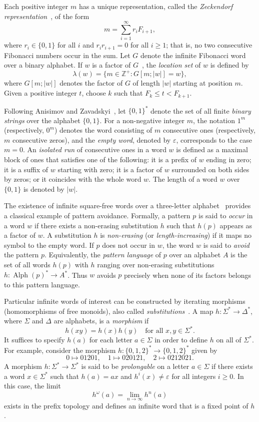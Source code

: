 \documentclass[12pt, a4paper]{article}
\begin{document}
Each positive integer $m$ has a unique representation, called the \emph{Zeckendorf representation}~\cite{Shah2021}, of the form
\[
m = \sum_{i=1}^{\infty} r_i F_{i+1},
\]
where $r_i \in \{0,1\}$ for all $i$ and $r_i r_{i+1} = 0$ for all $i \ge 1$; that is, no two consecutive Fibonacci numbers occur in the sum. Let $G$ denote the infinite Fibonacci word over a binary alphabet. If $w$ is a factor of $G$~\cite{Chuan2005}, the \emph{location set} of $w$ is defined by
\[
\lambda(w) = \{ m \in \mathbb{Z}^+ : G[m;|w|] = w \},
\]
where $G[m;|w|]$ denotes the factor of $G$ of length $|w|$ starting at position $m$. Given a positive integer $t$, choose $k$ such that $F_k \le t < F_{k+1}$.

Following Anisimov and Zavadskyi~\cite{Anisimov2017}, let $\{0,1\}^*$ denote the set of all finite \emph{binary strings} over the alphabet $\{0,1\}$. For a non-negative integer $m$, the notation $1^m$ (respectively, $0^m$) denotes the word consisting of $m$ consecutive ones (respectively, $m$ consecutive zeros), and the \emph{empty word}, denoted by $\varepsilon$, corresponds to the case $m=0$. An \emph{isolated run} of consecutive ones in a word $w$ is defined as a maximal block of ones that satisfies one of the following: it is a prefix of $w$ ending in zero; it is a suffix of $w$ starting with zero; it is a factor of $w$ surrounded on both sides by zeros; or it coincides with the whole word $w$. The length of a word $w$ over $\{0,1\}$ is denoted by $|w|$.

The existence of infinite square-free words over a three-letter alphabet~\cite{Berstel2007} provides a classical example of pattern avoidance. Formally, a pattern $p$ is said to \emph{occur} in a word $w$ if there exists a non-erasing substitution $h$ such that $h(p)$ appears as a factor of $w$. A substitution $h$ is \emph{non-erasing} (or \emph{length-increasing}) if it maps no symbol to the empty word. If $p$ does not occur in $w$, the word $w$ is said to \emph{avoid} the pattern $p$. Equivalently, the \emph{pattern language} of $p$ over an alphabet $A$ is the set of all words $h(p)$ with $h$ ranging over non-erasing substitutions $h : \operatorname{Alph}(p)^* \to A^*$. Thus $w$ avoids $p$ precisely when none of its factors belongs to this pattern language.

Particular infinite words of interest can be constructed by iterating morphisms (homomorphisms of free monoids), also called \emph{substitutions}~\cite{Berthé2016}. A map $h : \Sigma^* \to \Delta^*$, where $\Sigma$ and $\Delta$ are alphabets, is a \emph{morphism} if
\[
h(xy) = h(x)h(y) \quad \text{for all } x,y \in \Sigma^*.
\]
It suffices to specify $h(a)$ for each letter $a \in \Sigma$ in order to define $h$ on all of $\Sigma^*$. For example, consider the morphism $h : \{0,1,2\}^* \to \{0,1,2\}^*$ given by
\[
0 \mapsto 01201,\quad 1 \mapsto 020121,\quad 2 \mapsto 0212021.
\]
A morphism $h : \Sigma^* \to \Sigma^*$ is said to be \emph{prolongable} on a letter $a \in \Sigma$ if there exists a word $x \in \Sigma^*$ such that $h(a) = ax$ and $h^i(x) \ne \varepsilon$ for all integers $i \ge 0$. In this case, the limit
\[
h^\omega(a) = \lim_{n \to \infty} h^n(a)
\]
exists in the prefix topology and defines an infinite word that is a fixed point of $h$.
\end{document}
